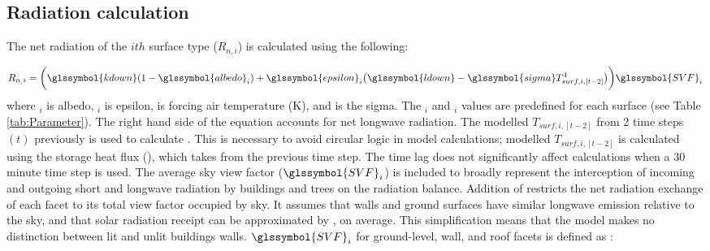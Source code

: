 \documentclass[final,3p,times,authoryear]{elsarticle}
\begin{document}





\subsection{Radiation calculation}\label{sec:net}




The net radiation of the $ith$ surface type ($R_{n,i}$) is calculated using the following:

\begin{equation} 
R_{n_,i}  = \bigg(\glssymbol{kdown} (1-\glssymbol{albedo}_{i}) + \glssymbol{epsilon}_{i} \big(\glssymbol{ldown} - \glssymbol{sigma} T_{surf,i,[t-2]}^{4}\big) \bigg)\glssymbol{SVF}_{i}
\label{eq:rn2} \end{equation} where $_{i}$ is \glsdesc{albedo}, $_{i}$ is \glsdesc{epsilon},  is forcing air temperature (K), and  is the \glsdesc{sigma}. The $_{i}$ and $_{i}$ values are predefined for each surface (see Table \ref{tab:Parameter}).  The right hand side of the equation accounts for net longwave radiation. The modelled $T_{surf,i,[t-2]}$ from 2 time steps $(t)$ previously is used to calculate . This is necessary to avoid circular logic in model calculations; modelled $T_{surf,i,[t-2]}$ is calculated using  the storage heat flux (), which takes  from the previous time step.  The time lag does not significantly affect calculations when a 30 minute time step is used. The average sky view factor ($\glssymbol{SVF}_{i}$) is included to broadly represent the  interception of incoming and outgoing short and longwave radiation by buildings and trees on the radiation balance. Addition of  restricts the net radiation exchange of each facet to its total view factor occupied by sky. It assumes that walls and ground surfaces have similar longwave emission relative to the sky, and that solar radiation receipt can be approximated by , on average. This simplification means that the model makes no distinction  between lit and unlit buildings walls.   $\glssymbol{SVF}_{i}$ for ground-level, wall, and roof facets is defined as \citep{Sparrow1978}:
\end{document}
